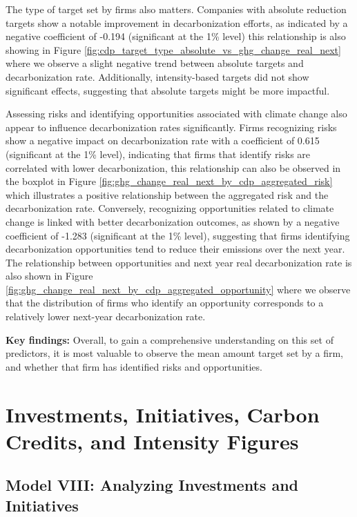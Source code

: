 The type of target set by firms also matters. Companies with absolute reduction targets show a notable improvement in decarbonization efforts, as indicated by a negative coefficient of -0.194 (significant at the 1\% level) this relationship is also showing in Figure \ref{fig:cdp_target_type_absolute_vs_ghg_change_real_next} where we observe a slight negative trend between absolute targets and decarbonization rate. Additionally, intensity-based targets did not show significant effects, suggesting that absolute targets might be more impactful.


Assessing risks and identifying opportunities associated with climate change also appear to influence decarbonization rates significantly. Firms recognizing risks show a negative impact on decarbonization rate with a coefficient of 0.615 (significant at the 1\% level), indicating that firms that identify risks are correlated with lower decarbonization, this relationship can also be observed in the boxplot in Figure \ref{fig:ghg_change_real_next_by_cdp_aggregated_risk} which illustrates a positive relationship between the aggregated risk and the decarbonization rate. Conversely, recognizing opportunities related to climate change is linked with better decarbonization outcomes, as shown by a negative coefficient of -1.283 (significant at the 1\% level), suggesting that firms identifying decarbonization opportunities tend to reduce their emissions over the next year. The relationship between opportunities and next year real decarbonization rate is also shown in Figure \ref{fig:ghg_change_real_next_by_cdp_aggregated_opportunity} where we observe that the distribution of firms who identify an opportunity corresponds to a relatively lower next-year decarbonization rate.


\textbf{Key findings:} Overall, to gain a comprehensive understanding on this set of predictors, it is most valuable to observe the mean amount target set by a firm, and whether that firm has identified risks and opportunities.


\section{Investments, Initiatives, Carbon Credits, and Intensity Figures}

\subsection{Model VIII: Analyzing Investments and Initiatives}

